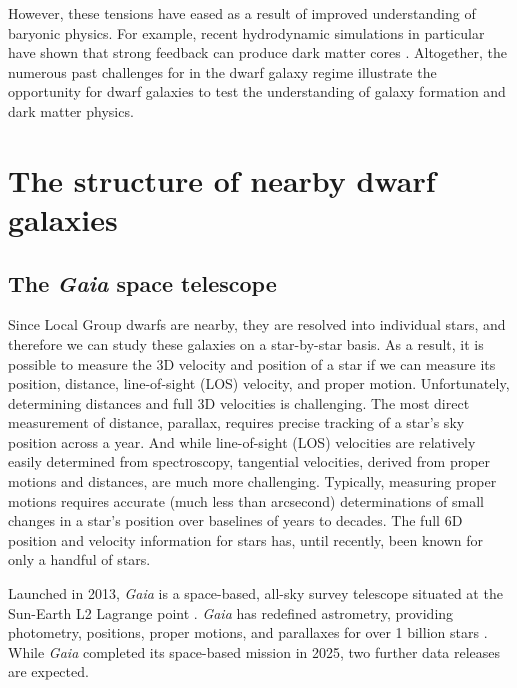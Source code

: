 However, these tensions have eased as a result of improved understanding
of baryonic physics. For example, recent hydrodynamic simulations in
particular have shown that strong feedback can produce dark matter cores
\citetext{\citealp[e.g.,][\citet{tollet+2016}]{navarro+eke+frenk1996}; \citealp{fitts+2017}; \citealp{benitez-llambay+2019}; \citealp{orkney+2021}}.
Altogether, the numerous past challenges for \LCDM{} in the dwarf galaxy
regime illustrate the opportunity for dwarf galaxies to test the
understanding of galaxy formation and dark matter physics.

\section{The structure of nearby dwarf
galaxies}\label{the-structure-of-nearby-dwarf-galaxies}

\subsection{\texorpdfstring{The \emph{Gaia} space
telescope}{The Gaia space telescope}}\label{the-gaia-space-telescope}

Since Local Group dwarfs are nearby, they are resolved into individual
stars, and therefore we can study these galaxies on a star-by-star
basis. As a result, it is possible to measure the 3D velocity and
position of a star if we can measure its position, distance,
line-of-sight (LOS) velocity, and proper motion. Unfortunately,
determining distances and full 3D velocities is challenging. The most
direct measurement of distance, parallax, requires precise tracking of a
star's sky position across a year. And while line-of-sight (LOS)
velocities are relatively easily determined from spectroscopy,
tangential velocities, derived from proper motions and distances, are
much more challenging. Typically, measuring proper motions requires
accurate (much less than arcsecond) determinations of small changes in a
star's position over baselines of years to decades. The full 6D position
and velocity information for stars has, until recently, been known for
only a handful of stars.

Launched in 2013, \emph{Gaia} is a space-based, all-sky survey telescope
situated at the Sun-Earth L2 Lagrange point
\citep{gaiacollaboration+2016}. \emph{Gaia} has redefined astrometry,
providing photometry, positions, proper motions, and parallaxes for over
1 billion stars \citep{gaiacollaboration+2021}. While \emph{Gaia}
completed its space-based mission in 2025, two further data releases are
expected.

